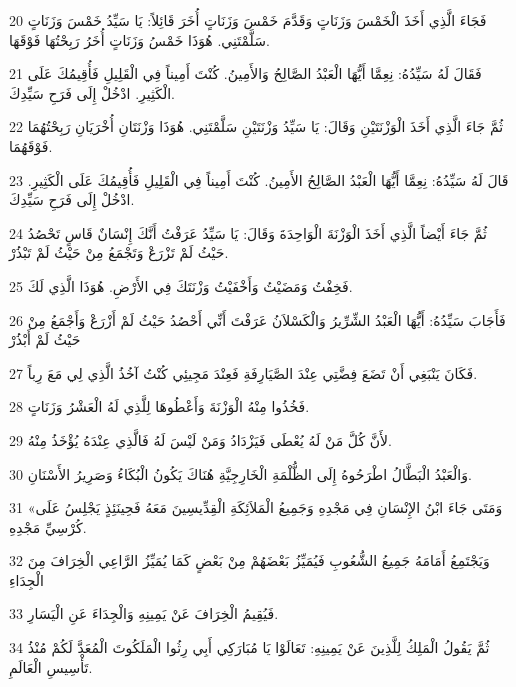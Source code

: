 \par 20 فَجَاءَ الَّذِي أَخَذَ الْخَمْسَ وَزَنَاتٍ وَقَدَّمَ خَمْسَ وَزَنَاتٍ أُخَرَ قَائِلاً: يَا سَيِّدُ خَمْسَ وَزَنَاتٍ سَلَّمْتَنِي. هُوَذَا خَمْسُ وَزَنَاتٍ أُخَرُ رَبِحْتُهَا فَوْقَهَا.
\par 21 فَقَالَ لَهُ سَيِّدُهُ: نِعِمَّا أَيُّهَا الْعَبْدُ الصَّالِحُ وَالأَمِينُ. كُنْتَ أَمِيناً فِي الْقَلِيلِ فَأُقِيمُكَ عَلَى الْكَثِيرِ. ادْخُلْ إِلَى فَرَحِ سَيِّدِكَ.
\par 22 ثُمَّ جَاءَ الَّذِي أَخَذَ الْوَزْنَتَيْنِ وَقَالَ: يَا سَيِّدُ وَزْنَتَيْنِ سَلَّمْتَنِي. هُوَذَا وَزْنَتَانِ أُخْرَيَانِ رَبِحْتُهُمَا فَوْقَهُمَا.
\par 23 قَالَ لَهُ سَيِّدُهُ: نِعِمَّا أَيُّهَا الْعَبْدُ الصَّالِحُ الأَمِينُ. كُنْتَ أَمِيناً فِي الْقَلِيلِ فَأُقِيمُكَ عَلَى الْكَثِيرِ. ادْخُلْ إِلَى فَرَحِ سَيِّدِكَ.
\par 24 ثُمَّ جَاءَ أَيْضاً الَّذِي أَخَذَ الْوَزْنَةَ الْوَاحِدَةَ وَقَالَ: يَا سَيِّدُ عَرَفْتُ أَنَّكَ إِنْسَانٌ قَاسٍ تَحْصُدُ حَيْثُ لَمْ تَزْرَعْ وَتَجْمَعُ مِنْ حَيْثُ لَمْ تَبْذُرْ.
\par 25 فَخِفْتُ وَمَضَيْتُ وَأَخْفَيْتُ وَزْنَتَكَ فِي الأَرْضِ. هُوَذَا الَّذِي لَكَ.
\par 26 فَأَجَابَ سَيِّدُهُ: أَيُّهَا الْعَبْدُ الشِّرِّيرُ وَالْكَسْلاَنُ عَرَفْتَ أَنِّي أَحْصُدُ حَيْثُ لَمْ أَزْرَعْ وَأَجْمَعُ مِنْ حَيْثُ لَمْ أَبْذُرْ
\par 27 فَكَانَ يَنْبَغِي أَنْ تَضَعَ فِضَّتِي عِنْدَ الصَّيَارِفَةِ فَعِنْدَ مَجِيئِي كُنْتُ آخُذُ الَّذِي لِي مَعَ رِباً.
\par 28 فَخُذُوا مِنْهُ الْوَزْنَةَ وَأَعْطُوهَا لِلَّذِي لَهُ الْعَشْرُ وَزَنَاتٍ.
\par 29 لأَنَّ كُلَّ مَنْ لَهُ يُعْطَى فَيَزْدَادُ وَمَنْ لَيْسَ لَهُ فَالَّذِي عِنْدَهُ يُؤْخَذُ مِنْهُ.
\par 30 وَالْعَبْدُ الْبَطَّالُ اطْرَحُوهُ إِلَى الظُّلْمَةِ الْخَارِجِيَّةِ هُنَاكَ يَكُونُ الْبُكَاءُ وَصَرِيرُ الأَسْنَانِ.
\par 31 «وَمَتَى جَاءَ ابْنُ الإِنْسَانِ فِي مَجْدِهِ وَجَمِيعُ الْمَلاَئِكَةِ الْقِدِّيسِينَ مَعَهُ فَحِينَئِذٍ يَجْلِسُ عَلَى كُرْسِيِّ مَجْدِهِ.
\par 32 وَيَجْتَمِعُ أَمَامَهُ جَمِيعُ الشُّعُوبِ فَيُمَيِّزُ بَعْضَهُمْ مِنْ بَعْضٍ كَمَا يُمَيِّزُ الرَّاعِي الْخِرَافَ مِنَ الْجِدَاءِ
\par 33 فَيُقِيمُ الْخِرَافَ عَنْ يَمِينِهِ وَالْجِدَاءَ عَنِ الْيَسَارِ.
\par 34 ثُمَّ يَقُولُ الْمَلِكُ لِلَّذِينَ عَنْ يَمِينِهِ: تَعَالَوْا يَا مُبَارَكِي أَبِي رِثُوا الْمَلَكُوتَ الْمُعَدَّ لَكُمْ مُنْذُ تَأْسِيسِ الْعَالَمِ.
